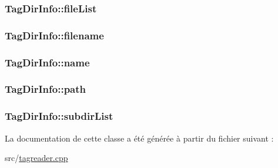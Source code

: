 \subsubsection[{file\+List}]{ Tag\+Dir\+Info\+::file\+List}\label{class_tag_dir_info_a768be96c04e1196b7383de14306752b3}
\hypertarget{class_tag_dir_info_aa23bec9b1cf39df5803c6d6d2a8a4023}{}
\subsubsection[{filename}]{ Tag\+Dir\+Info\+::filename}\label{class_tag_dir_info_aa23bec9b1cf39df5803c6d6d2a8a4023}
\hypertarget{class_tag_dir_info_a5cfeefe508646d16441497e8fedf5781}{}
\subsubsection[{name}]{ Tag\+Dir\+Info\+::name}\label{class_tag_dir_info_a5cfeefe508646d16441497e8fedf5781}
\hypertarget{class_tag_dir_info_a55aa3de3e3bfdd5dbf01f59356459ccd}{}
\subsubsection[{path}]{ Tag\+Dir\+Info\+::path}\label{class_tag_dir_info_a55aa3de3e3bfdd5dbf01f59356459ccd}
\hypertarget{class_tag_dir_info_aa92f9d1b26a45555036ae1fd4b32600e}{}
\subsubsection[{subdir\+List}]{ Tag\+Dir\+Info\+::subdir\+List}\label{class_tag_dir_info_aa92f9d1b26a45555036ae1fd4b32600e}


La documentation de cette classe a été générée à partir du fichier suivant \+:\begin{DoxyCompactItemize}
\item 
src/\hyperlink{tagreader_8cpp}{tagreader.\+cpp}\end{DoxyCompactItemize}

